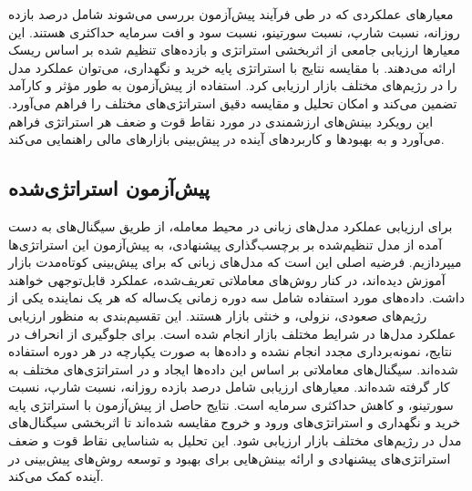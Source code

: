معیارهای عملکردی که در طی فرآیند پیش‌آزمون بررسی می‌شوند شامل درصد بازده روزانه، نسبت شارپ، نسبت سورتینو، نسبت سود و افت سرمایه حداکثری هستند. این معیارها ارزیابی جامعی از اثربخشی استراتژی و بازده‌های تنظیم شده بر اساس ریسک ارائه می‌دهند. با مقایسه نتایج با استراتژی پایه خرید و نگهداری، می‌توان عملکرد مدل را در رژیم‌های مختلف بازار ارزیابی کرد. استفاده از پیش‌آزمون به طور مؤثر و کارآمد تضمین می‌کند و امکان تحلیل و مقایسه دقیق استراتژی‌های مختلف را فراهم می‌آورد. این رویکرد بینش‌های ارزشمندی در مورد نقاط قوت و ضعف هر استراتژی فراهم می‌آورد و به بهبودها و کاربردهای آینده در پیش‌بینی بازارهای مالی راهنمایی می‌کند.

\subsection{پیش‌آزمون استراتژی‌شده}

برای ارزیابی عملکرد مدل‌های زبانی در محیط معامله، از طریق سیگنال‌های به دست آمده از مدل تنظیم‌شده بر برچسب‌گذاری پیشنهاد‌ی، به پیش‌آزمون این استراتژی‌ها میپردازیم. فرضیه اصلی این است که مدل‌های زبانی که برای پیش‌بینی کوتاه‌مدت بازار آموزش دیده‌اند، در کنار روش‌های معاملاتی تعریف‌شده، عملکرد قابل‌توجهی خواهند داشت. داده‌های مورد استفاده شامل سه دوره زمانی یک‌ساله که هر یک نماینده یکی از رژیم‌های صعودی، نزولی، و خنثی بازار هستند. این تقسیم‌بندی به منظور ارزیابی عملکرد مدل‌ها در شرایط مختلف بازار انجام شده است. برای جلوگیری از انحراف در نتایج، نمونه‌برداری مجدد انجام نشده و داده‌ها به صورت یکپارچه در هر دوره استفاده شده‌اند. سیگنال‌های معاملاتی بر اساس این داده‌ها ایجاد و در استراتژی‌های مختلف به کار گرفته شده‌اند. معیارهای ارزیابی شامل درصد بازده روزانه، نسبت شارپ، نسبت سورتینو، و کاهش حداکثری سرمایه است. نتایج حاصل از پیش‌آزمون با استراتژی پایه خرید و نگهداری و استراتژی‌های ورود و خروج مقایسه شده‌اند تا اثربخشی سیگنال‌های مدل در رژیم‌های مختلف بازار ارزیابی شود. این تحلیل به شناسایی نقاط قوت و ضعف استراتژی‌های پیشنهادی و ارائه بینش‌هایی برای بهبود و توسعه روش‌های پیش‌بینی در آینده کمک می‌کند.
